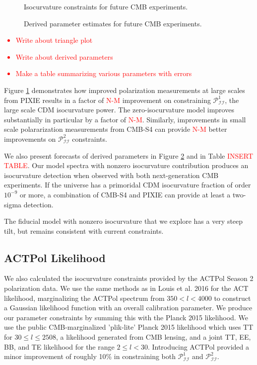 \documentclass{emulateapj}
\newcommand\writingnote[1]{\textcolor{red}{#1}}
\newcommand{\pii}{ \mathcal{P}_{\mathcal{I}\mathcal{I}} }
\begin{document}
\afterpage{\clearpage}
\begin{figure}[p]
\caption{Isocurvature constraints for future CMB experiments.\label{fig:triangleplots}}
\end{figure}



\afterpage{\clearpage}
\begin{figure}[p]
\caption{Derived parameter estimates for future CMB experiments.\label{fig:derivedparams}}
\end{figure}

\writingnote{
    \begin{itemize}
        \item Write about triangle plot
        \item Write about derived parameters
        \item Make a table summarizing various parameters with errors
    \end{itemize}
}

Figure \ref{fig:triangleplots} demonstrates how improved polarization measurements at large scales from PIXIE results in a factor of \writingnote{N-M} improvement on constraining $\pii^1$, the large scale CDM isocurvature power. The zero-isocurvature model improves substantially in particular by a factor of \writingnote{N-M}. Similarly, improvements in small scale polararization measurements from CMB-S4 can provide \writingnote{N-M} better improvements on $\pii^2$ constraints.

We also present forecasts of derived parameters in Figure \ref{fig:derivedparams} and in Table \writingnote{INSERT TABLE}. Our model spectra with nonzero isocurvature contribution produces an isocurvature detection when observed with both next-generation CMB experiments. If the universe has a primoridal CDM isocurvature fraction of order $10^{-9}$ or more, a combination of CMB-S4 and PIXIE can provide at least a two-sigma detection. 

The fiducial model with nonzero isocurvature that we explore has a very steep tilt, but remains consistent with current constraints. 


\subsection{ACTPol Likelihood}\label{actpol}

We also calculated the isocurvature constraints provided by the ACTPol Season 2 polarization data. We use the same methods as in Louis et al. 2016 for the ACT likelihood, marginalizing the ACTPol spectrum from $350 < l < 4000$ to construct a Gaussian likelihood function with an overall calibration parameter. We produce our parameter constraints by summing this with the Planck 2015 likelihood. We use the public CMB-marginalized 'plik-lite' Planck 2015 likelihood which uses TT for $30 \leq l \leq 2508$, a likelihood generated from CMB lensing, and a joint TT, EE, BB, and TE likelihood for the range $2 \leq l < 30$. Introducing ACTPol provided a minor improvement of roughly 10\% in constraining both $\pii^1$ and $\pii^2$.
\end{document}
